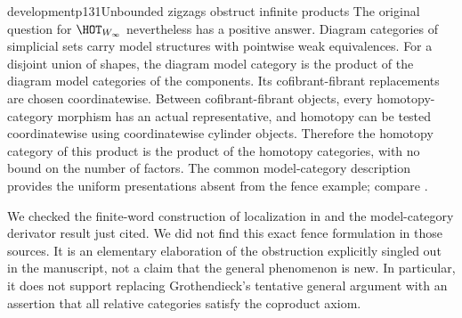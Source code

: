 \begin{dcomment}{development}{p131}{Unbounded zigzags obstruct infinite products}
The original question for $\HOT_{W_\infty}$ nevertheless has a positive answer. Diagram categories of simplicial sets carry model structures with pointwise weak equivalences. For a disjoint union of shapes, the diagram model category is the product of the diagram model categories of the components. Its cofibrant-fibrant replacements are chosen coordinatewise. Between cofibrant-fibrant objects, every homotopy-category morphism has an actual representative, and homotopy can be tested coordinatewise using coordinatewise cylinder objects. Therefore the homotopy category of this product is the product of the homotopy categories, with no bound on the number of factors. The common model-category description provides the uniform presentations absent from the fence example; compare \citet[Proposition~1.30]{Groth2013}.

We checked the finite-word construction of localization in \citet[Chapter~I, \S1]{GabrielZisman1967} and the model-category derivator result just cited. We did not find this exact fence formulation in those sources. It is an elementary elaboration of the obstruction explicitly singled out in the manuscript, not a claim that the general phenomenon is new. In particular, it does not support replacing Grothendieck's tentative general argument with an assertion that all relative categories satisfy the coproduct axiom.
\end{dcomment}

